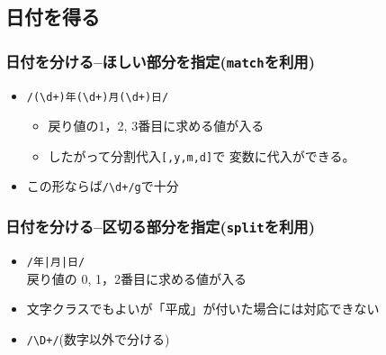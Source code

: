  \subsection{日付を得る}
 \begin{frame}[containsverbatim]
	\frametitle{日付を分ける--ほしい部分を指定(\texttt{match}を利用)}
	\begin{itemize}
	 \item \Verb-/(\d+)年(\d+)月(\d+)日/-
				 \begin{itemize}
					\item 戻り値の1，2, 3番目に求める値が入る
					\item したがって分割代入\texttt{[,y,m,d]}で
								変数に代入ができる。
				 \end{itemize}
	 \item この形ならば\verb-/\d+/g-で十分
	\end{itemize}
 \end{frame}
 \begin{frame}[containsverbatim]
	\frametitle{日付を分ける--区切る部分を指定(\texttt{split}を利用)}
	\begin{itemize}
	 \item \texttt{/年|月|日/}\\
					戻り値の 0, 1，2番目に求める値が入る
	 \item 文字クラスでもよいが「平成」が付いた場合には対応できない
	 \item \Verb-/\D+/-(数字以外で分ける)
	\end{itemize}
 \end{frame}
 \iffalse\else
